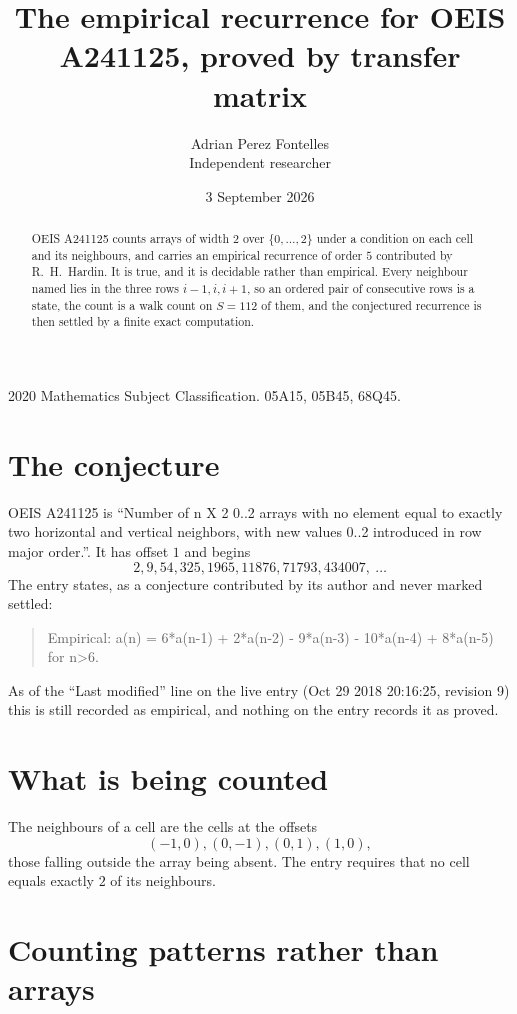 \documentclass[11pt,a4paper]{article}
\title{The empirical recurrence for OEIS A241125, proved by transfer matrix}
\author{Adrian Perez Fontelles\\ \small Independent researcher}
\date{3 September 2026}
\theoremstyle{plain}
\theoremstyle{definition}
\begin{document}
\maketitle

\begin{abstract}
OEIS A241125 counts arrays of width $2$ over $\{0,\dots,2\}$ under a condition on each cell
and its neighbours, and carries an empirical recurrence of order $5$ contributed by
R.~H.~Hardin. It is true, and it is decidable rather than empirical. Every neighbour named lies
in the three rows $i-1,i,i+1$, so an ordered pair of consecutive rows is a state, the count is
a walk count on $S=112$ of them, and the conjectured recurrence is then settled by a finite
exact computation.
\end{abstract}

\noindent\small 2020 Mathematics Subject Classification. 05A15, 05B45, 68Q45.\normalsize

\section{The conjecture}

OEIS A241125 is ``Number of n X 2 0..2 arrays with no element equal to exactly two horizontal and vertical neighbors, with new values 0..2 introduced in row major order.''. It has offset $1$ and begins
\[
2, 9, 54, 325, 1965, 11876, 71793, 434007,\ \dots
\]
The entry states, as a conjecture contributed by its author and never marked settled:
\begin{quote}
Empirical: a(n) = 6*a(n-1) + 2*a(n-2) -  9*a(n-3) - 10*a(n-4) + 8*a(n-5) for n>6.
\end{quote}
As of the ``Last modified'' line on the live entry (Oct 29 2018 20:16:25, revision 9) this is still
recorded as empirical, and nothing on the entry records it as proved.

\section{What is being counted}

The neighbours of a cell are the cells at the offsets
\[
(-1,0), (0,-1), (0,1), (1,0),
\]
those falling outside the array being absent. The entry requires that no cell equals exactly $2$ of its neighbours.

\section{Counting patterns rather than arrays}
\end{document}
